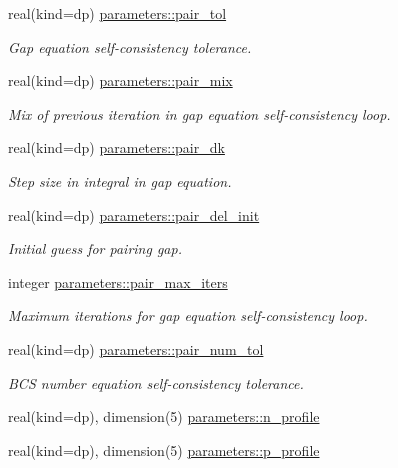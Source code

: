 \begin{DoxyCompactItemize}
real(kind=dp) \mbox{\hyperlink{group__INPUT__PARS_ga9b9d6d0cf64fa6e7f9dd00f5b15848bd}{parameters\+::pair\+\_\+tol}}
\begin{DoxyCompactList}\small\item\em Gap equation self-\/consistency tolerance. \end{DoxyCompactList}\item 
real(kind=dp) \mbox{\hyperlink{group__INPUT__PARS_ga6fdafa171f65aa7236a9c76ebaab4d08}{parameters\+::pair\+\_\+mix}}
\begin{DoxyCompactList}\small\item\em Mix of previous iteration in gap equation self-\/consistency loop. \end{DoxyCompactList}\item 
real(kind=dp) \mbox{\hyperlink{group__INPUT__PARS_ga1c083bc7a4e3979327020ec3e1509220}{parameters\+::pair\+\_\+dk}}
\begin{DoxyCompactList}\small\item\em Step size in integral in gap equation. \end{DoxyCompactList}\item 
real(kind=dp) \mbox{\hyperlink{group__INPUT__PARS_ga9fe26afec63d3ebfb7900ccc330779d0}{parameters\+::pair\+\_\+del\+\_\+init}}
\begin{DoxyCompactList}\small\item\em Initial guess for pairing gap. \end{DoxyCompactList}\item 
integer \mbox{\hyperlink{group__INPUT__PARS_gafef003bd348d08faadb13f56378b8e4c}{parameters\+::pair\+\_\+max\+\_\+iters}}
\begin{DoxyCompactList}\small\item\em Maximum iterations for gap equation self-\/consistency loop. \end{DoxyCompactList}\item 
real(kind=dp) \mbox{\hyperlink{group__INPUT__PARS_gad39a7f1795d33065b388d6966d51e190}{parameters\+::pair\+\_\+num\+\_\+tol}}
\begin{DoxyCompactList}\small\item\em B\+CS number equation self-\/consistency tolerance. \end{DoxyCompactList}\item 
real(kind=dp), dimension(5) \mbox{\hyperlink{group__EXT__PROFILES_ga212100ee82dc6c5f66b280c3d3c59587}{parameters\+::n\+\_\+profile}}
\item 
real(kind=dp), dimension(5) \mbox{\hyperlink{group__EXT__PROFILES_gac33314b2e7b3b80461c26fff4b4f6a71}{parameters\+::p\+\_\+profile}}

\end{DoxyCompactItemize}
